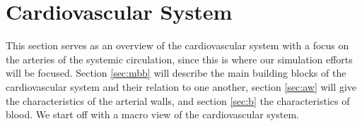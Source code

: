 \documentclass[a4paper, oneside]{discothesis}
\begin{document}








\chapter{Cardiovascular System} \label{chap:cvs}
This section serves as an overview of the cardiovascular system with a focus on the arteries of the systemic circulation, since this is where our simulation efforts will be focused. 
Section \ref{sec:mbb} will describe the main building blocks of the cardiovascular system and their relation to one another, section \ref{sec:aw} will give the characteristics of the arterial walls, and section \ref{sec:b} the characteristics of blood.
We start off with a macro view of the cardiovascular system.
\end{document}
